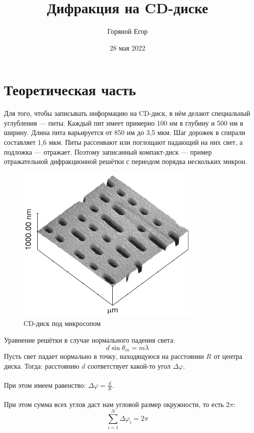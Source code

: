 \documentclass[a4paper]{article}
\begin{document}
\author{Горяной Егор}
\date{28 мая 2022}
\title{Дифракция на CD-диске}
\maketitle


\section{Теоретическая часть}
{Для того, чтобы записывать информацию на CD-диск, в нём делают специальный углубления --- питы. Каждый пит имеет примерно 100 нм в глубину и 500 нм в ширину. Длина пита варьируется от 850 нм до 3,5 мкм. Шаг дорожек в спирали составляет 1,6 мкм. Питы рассеивают или поглощают падающий на них свет, а подложка — отражает. Поэтому записанный компакт-диск — пример отражательной дифракционной решётки с периодом порядка нескольких микрон.}
\begin{figure}[H]
    \centering
    \includegraphics[scale=1]{cd_disk.png}
    \caption{CD-диск под микросопом}
\end{figure}
Уравнение решётки в случае нормального падения света:
\begin{equation}\label{eq1}
d\sin\theta_m=m\lambda
\end{equation}
Пусть свет падает нормально в точку, находящуюся на расстоянии $R$ от центра диска. Тогда: расстоянию $d$ соответствует какой-то угол $\Delta\varphi$.\\
\\
При этом имеем равенство: $\Delta\varphi=\displaystyle\frac{d}{R}$.\\
\\
При этом сумма всех углов даст нам угловой размер окружности, то есть $2\pi$:
\begin{equation}\label{eq2}
\displaystyle\sum\limits_{i=1}^{N}\Delta\varphi_i =2\pi
\end{equation}
\end{document}
